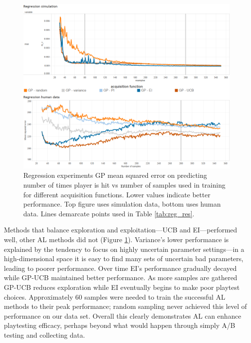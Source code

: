 \documentclass{sig-alternate}
\begin{document}
\begin{figure}[tb]
\centering
\includegraphics[width=\linewidth]{regression_results}
\caption{Regression experiments GP mean squared error on predicting number of times player is hit vs number of samples used in training for different acquisition functions. Lower values indicate better performance. Top figure uses simulation data, bottom uses human data. Lines demarcate points used in Table \ref{tab:reg_res}.}
\label{fig:reg_all}
\end{figure}


Methods that balance exploration and exploitation---UCB and EI---performed well, other AL methods did not (Figure \ref{fig:reg_all}).
Variance's lower performance is explained by the tendency to focus on highly uncertain parameter settings---in a high-dimensional space it is easy to find many sets of uncertain bad parameters, leading to poorer performance.
Over time EI's performance gradually decayed while GP-UCB maintained better performance.
As more samples are gathered GP-UCB reduces exploration while EI eventually begins to make poor playtest choices.
Approximately 60 samples were needed to train the successful AL methods to their peak performance; random sampling never achieved this level of performance on our data set.
Overall this clearly demonstrates AL can enhance playtesting efficacy, perhaps beyond what would happen through simply A/B testing and collecting data.
\end{document}
